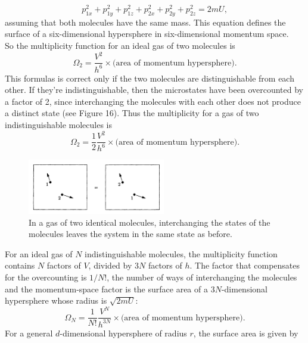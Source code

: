\documentclass[11pt]{exam}
\begin{document}
\begin{equation}\tag{2.35}
p_{1x}^2+p_{1y}^2+p_{1z}^2+p_{2x}^2+p_{2y}^2+p_{2z}^2 = 2mU,    
\end{equation}
assuming that both molecules have the same mass. This equation defines the surface of a six-dimensional hypersphere in six-dimensional momentum space. \\
\hspace*{10mm}So the multiplicity function for an ideal gas of two molecules is
\begin{equation}\tag{2.36}
\Omega_2=\frac{V^2}{h^6}\times \text{(area of momentum hypersphere)}.
\end{equation}
This formulas is correct only if the two molecules are distinguishable from each other. If they're indistinguishable, then the microstates have been overcounted by a factor of 2, since interchanging the molecules with each other does not produce a distinct state (see Figure 16). Thus the multiplicity for a gas of two indistinguishable molecules is 
\begin{equation}\tag{2.37}
\Omega_2 = \frac{1}{2}\frac{V^2}{h^6}\times \text{(area of momentum hypersphere)}.
\end{equation}
\begin{figure}[htp]
    \centering
    \includegraphics[width=6cm]{figure16.png}
    \caption{In a gas of two identical molecules, interchanging the states of the molecules leaves the system in the same state as before.}
\label{fig:identitical-molecules}
\end{figure}
\newpage
\hspace*{10mm}For an ideal gas of $N$ indistinguishable molecules, the multiplicity function contains $N$ factors of $V$, divided by $3N$ factors of $h$. The factor that compensates for the overcounting is $1/N!$, the number of ways of interchanging the molecules and the momentum-space factor is the surface area of a $3N$-dimensional hypersphere whose radius is $\sqrt{2mU}$:
\begin{equation}\tag{2.38}
\Omega_N = \frac{1}{N!}\frac{V^N}{h^{3N}}\times \text{(area of momentum hypersphere)}.  
\end{equation}
\hspace*{10mm}For a general $d$-dimensional hypersphere of radius $r$, the surface area is given by 
\end{document}
